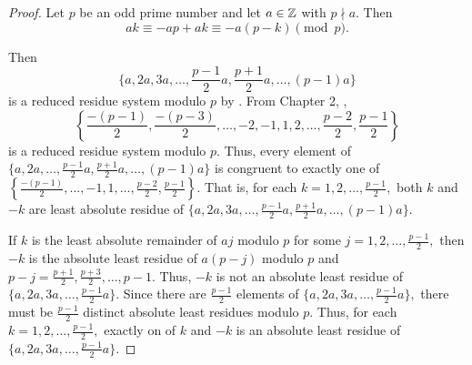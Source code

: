 \documentclass{ximera}
\begin{document}
\begin{proof}
	Let $p$ be an odd prime number and let $a\in\mathbb Z$ with $p\nmid a.$  Then \[ak\equiv-ap+ak\equiv -a(p-k)\pmod{p}.\]
	
	Then \[\{a,2a,3a,\dots,\frac{p-1}{2}a,\frac{p+1}{2}a,\dots,(p-1)a\}\] is a reduced residue system modulo $p$ by . From Chapter 2, , \[\left\{\frac{-(p-1)}{2}, \frac{-(p-3)}{2},\dots, -2,-1,1,2,\dots,\frac{p-2}{2},\frac{p-1}{2}\right\}\]
	is a reduced residue system modulo $p$. Thus, every element of $\{a,2a,\dots,\frac{p-1}{2}a,\frac{p+1}{2}a,\dots,(p-1)a\}$ is congruent to exactly one of $\left\{\frac{-(p-1)}{2}, \dots, -1,1,\dots,\frac{p-2}{2},\frac{p-1}{2}\right\}.$ That is, for each $k=1,2,\dots,\frac{p-1}{2},$ both $k$ and $-k$ are least absolute residue of $\{a,2a,3a,\dots,\frac{p-1}{2}a,\frac{p+1}{2}a,\dots,(p-1)a\}.$
	
	If $k$ is the least absolute remainder of $aj$ modulo $p$ for some $j=1,2,\dots, \frac{p-1}{2},$ then $-k$ is the absolute least residue of $a(p-j)$ modulo $p$ and $p-j=\frac{p+1}{2},\frac{p+3}{2},\dots,p-1.$ Thus, $-k$ is not an absolute least residue of $\{a,2a,3a,\dots,\frac{p-1}{2}a\}.$ Since there are $\frac{p-1}{2}$ elements of $\{a,2a,3a,\dots,\frac{p-1}{2}a\},$ there must be $\frac{p-1}{2}$ distinct absolute least residues modulo $p.$ Thus, for each $k=1,2,\dots,\frac{p-1}{2},$ exactly on of $k$ and $-k$ is an absolute least residue of $\{a,2a,3a,\dots,\frac{p-1}{2}a\}.$
\end{proof}
\end{document}
